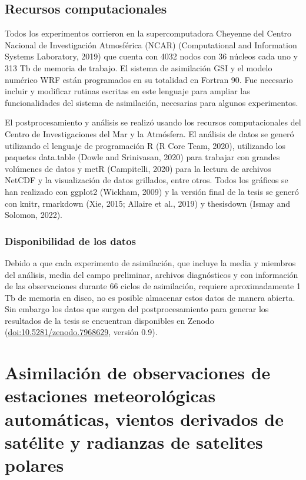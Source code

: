 \documentclass[12pt,oneside,a4paper]{reedthesis}
\begin{document}
\hypertarget{recursos-computacionales}{%
\section{Recursos computacionales}\label{recursos-computacionales}}

Todos los experimentos corrieron en la supercomputadora Cheyenne del Centro Nacional de Investigación Atmosférica (NCAR) (Computational and Information Systems Laboratory, 2019) que cuenta con 4032 nodos con 36 núcleos cada uno y 313 Tb de memoria de trabajo. El sistema de asimilación GSI y el modelo numérico WRF están programados en su totalidad en Fortran 90. Fue necesario incluir y modificar rutinas escritas en este lenguaje para ampliar las funcionalidades del sistema de asimilación, necesarias para algunos experimentos.

El postprocesamiento y análisis se realizó usando los recursos computacionales del Centro de Investigaciones del Mar y la Atmósfera. El análisis de datos se generó utilizando el lenguaje de programación R (R Core Team, 2020), utilizando los paquetes data.table (Dowle and Srinivasan, 2020) para trabajar con grandes volúmenes de datos y metR (Campitelli, 2020) para la lectura de archivos NetCDF y la visualización de datos grillados, entre otros.
Todos los gráficos se han realizado con ggplot2 (Wickham, 2009) y la versión final de la tesis se generó con knitr, rmarkdown (Xie, 2015; Allaire et al., 2019) y thesisdown (Ismay and Solomon, 2022).

\hypertarget{disponibilidad-de-los-datos}{%
\subsection{Disponibilidad de los datos}\label{disponibilidad-de-los-datos}}

Debido a que cada experimento de asimilación, que incluye la media y miembros del análisis, media del campo preliminar, archivos diagnósticos y con información de las observaciones durante 66 ciclos de asimilación, requiere aproximadamente 1 Tb de memoria en disco, no es posible almacenar estos datos de manera abierta. Sin embargo los datos que surgen del postprocesamiento para generar los resultados de la tesis se encuentran disponibles en Zenodo (\url{doi:10.5281/zenodo.7968629}, versión 0.9).

\hypertarget{cap-3-analisis}{%
\chapter{Asimilación de observaciones de estaciones meteorológicas automáticas, vientos derivados de satélite y radianzas de satelites polares}\label{cap-3-analisis}}
\end{document}
